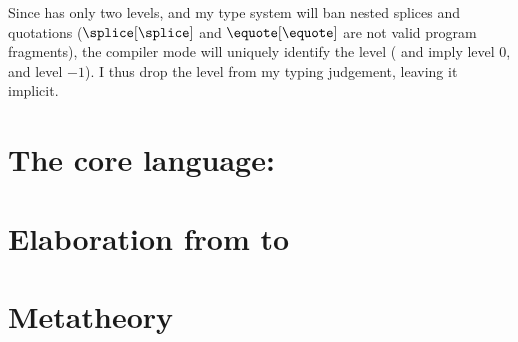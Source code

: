 Since \sourceLang{} has only two levels, and my type system will ban nested splices and quotations ($\splice[\splice]$ and $\equote[\equote]$ are not valid program fragments), the compiler mode will uniquely identify the level (\compilemode{} and \quotemode{} imply level $0$, and \splicemode{} level $-1$). I thus drop the level from my typing judgement, leaving it implicit.

\section{The core language: \texorpdfstring{\coreLang{}}{Lambda-Op-AST}}\label{section:core-lang}

\section{Elaboration from \texorpdfstring{\sourceLang{}}{Lambda-Op-Quote-Splice} to \texorpdfstring{\coreLang{}}{Lambda-Op-AST}}\label{section:elaboration}

\section{Metatheory}\label{section:metatheory}